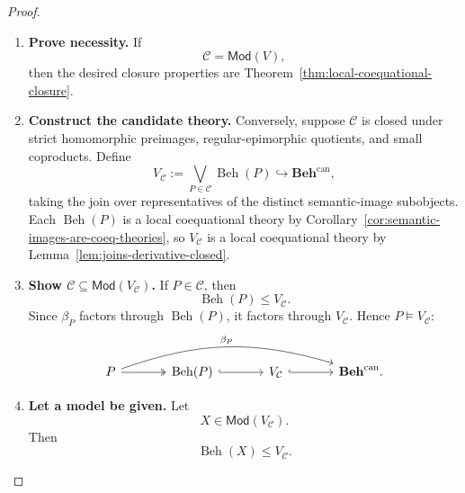 \begin{proof}
    \leavevmode
    \begin{enumerate}
        \item \textbf{Prove necessity.}
        If
        \[
            \mathcal C=\mathsf{Mod}(V),
        \]
        then the desired closure properties are
        Theorem~\ref{thm:local-coequational-closure}.

        \item \textbf{Construct the candidate theory.}
        Conversely, suppose \(\mathcal C\) is closed under strict homomorphic
        preimages, regular-epimorphic quotients, and small coproducts. Define
        \[
            V_{\mathcal C}
            :=
            \bigvee_{P\in\mathcal C}\operatorname{Beh}(P)
            \hookrightarrow\mathbf{Beh}^{\mathrm{can}},
        \]
        taking the join over representatives of the distinct semantic-image
        subobjects. Each \(\operatorname{Beh}(P)\) is a local coequational
        theory by
        Corollary~\ref{cor:semantic-images-are-coeq-theories}, so
        \(V_{\mathcal C}\) is a local coequational theory by
        Lemma~\ref{lem:joins-derivative-closed}.

        \item \textbf{Show \(\mathcal C\subseteq\mathsf{Mod}(V_{\mathcal C})\).}
        If \(P\in\mathcal C\), then
        \[
            \operatorname{Beh}(P)\leq V_{\mathcal C}.
        \]
        Since \(\beta_P\) factors through \(\operatorname{Beh}(P)\), it factors
        through \(V_{\mathcal C}\). Hence \(P\models V_{\mathcal C}\):
        \[
        \begin{tikzcd}[column sep=large, row sep=large]
            P
                \arrow[r, two heads]
                \arrow[rrr, bend left=18, "\beta_P"]
            &
            \operatorname{Beh}(P)
                \arrow[r, hook]
            &
            V_{\mathcal C}
                \arrow[r, hook]
            &
            \mathbf{Beh}^{\mathrm{can}} .
        \end{tikzcd}
        \]

        \item \textbf{Let a model be given.}
        Let
        \[
            X\in\mathsf{Mod}(V_{\mathcal C}).
        \]
        Then
        \[
            \operatorname{Beh}(X)\leq V_{\mathcal C}.
        \]


\end{enumerate}
\end{proof}
